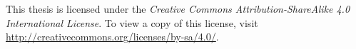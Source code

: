\documentclass[a4paper,12pt]{article}
\begin{document}
	\vfill

	\begin{figure}
		\vspace{-22pt}
		\begin{flushright}
			{\Huge \ccbysa}
		\end{flushright}
	\end{figure}

	\noindent This thesis is licensed under the \textit{Creative Commons Attribution-ShareAlike 4.0 International License}. To view a copy of this license, visit \url{http://creativecommons.org/licenses/by-sa/4.0/}.
\end{document}
